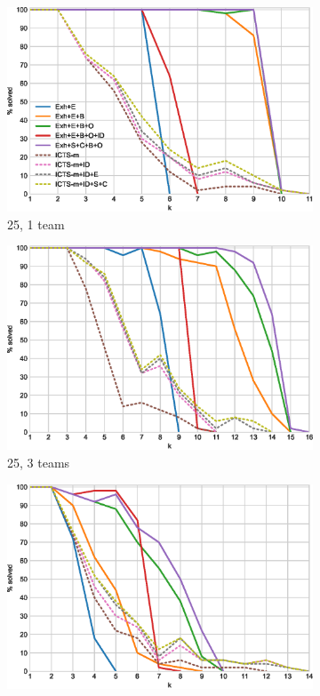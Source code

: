 \documentclass[english,10pt]{article}
\begin{document}
	\begin{figure}[t]
	\centering
	\begin{subfigure}{0.44\textwidth}
		\centering
		\includegraphics[width=\linewidth]{img/results/icts-comparison/25-1-p}
		\caption{25, 1 team}
		\label{fig:25-1-p}
	\end{subfigure}
	\begin{subfigure}{0.44\textwidth}
		\centering
		\includegraphics[width=\linewidth]{img/results/icts-comparison/25-3-p}
		\caption{25, 3 teams}
		\label{fig:25-3-p}
	\end{subfigure}
	\begin{subfigure}{0.44\textwidth}
		\centering
		\includegraphics[width=\linewidth]{img/results/icts-comparison/75-1-p}

\end{subfigure}
\end{figure}
\end{document}
